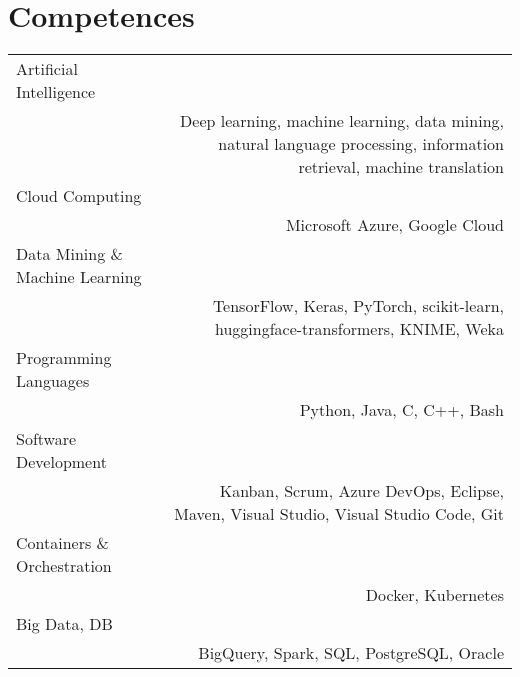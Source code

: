 \documentclass[10pt]{article}
\begin{document}
\section*{Competences}
\begin{tabular}{L!{\VRule}R}
Artificial Intelligence\\&Deep learning, machine learning, data mining, natural language processing, information retrieval, machine translation\\
Cloud Computing \\& Microsoft Azure, Google Cloud\\
Data Mining \& Machine Learning\\&TensorFlow, Keras, PyTorch, scikit-learn, huggingface-transformers, KNIME, Weka\\
Programming Languages\\&Python, Java, C, C++, Bash\\
Software Development\\&Kanban, Scrum, Azure DevOps, Eclipse, Maven, Visual Studio, Visual Studio Code, Git\\
Containers \& Orchestration\\ & Docker, Kubernetes\\
Big Data, DB\\& BigQuery, Spark, SQL, PostgreSQL, Oracle\\
\end{tabular}
\end{document}
